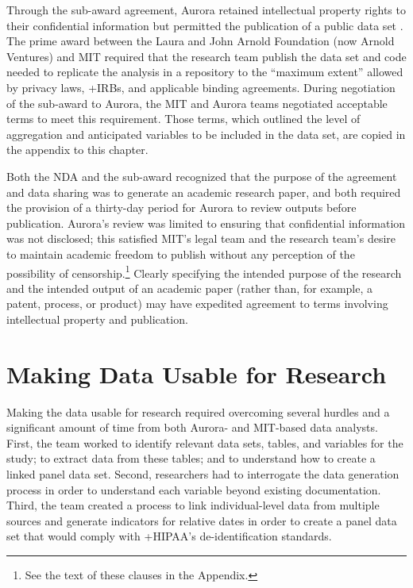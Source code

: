 \documentclass[
]{book}
\begin{document}
Through the sub-award agreement, Aurora retained intellectual property rights to their confidential information but permitted the publication of a public data set \citep[see][]{doyle2018}. The prime award between the Laura and John Arnold Foundation (now Arnold Ventures) and MIT required that the research team publish the data set and code needed to replicate the analysis in a repository to the ``maximum extent'' allowed by privacy laws, +IRB\textbar s, and applicable binding agreements. During negotiation of the sub-award to Aurora, the MIT and Aurora teams negotiated acceptable terms to meet this requirement. Those terms, which outlined the level of aggregation and anticipated variables to be included in the data set, are copied in the appendix to this chapter.

Both the NDA and the sub-award recognized that the purpose of the agreement and data sharing was to generate an academic research paper, and both required the provision of a thirty-day period for Aurora to review outputs before publication. Aurora's review was limited to ensuring that confidential information was not disclosed; this satisfied MIT's legal team and the research team's desire to maintain academic freedom to publish without any perception of the possibility of censorship.\footnote{See the text of these clauses in the Appendix.} Clearly specifying the intended purpose of the research and the intended output of an academic paper (rather than, for example, a patent, process, or product) may have expedited agreement to terms involving intellectual property and publication.

\hypertarget{making-data-usable-for-research-3}{%
\section{Making Data Usable for Research}\label{making-data-usable-for-research-3}}

Making the data usable for research required overcoming several hurdles and a significant amount of time from both Aurora- and MIT-based data analysts. First, the team worked to identify relevant data sets, tables, and variables for the study; to extract data from these tables; and to understand how to create a linked panel data set. Second, researchers had to interrogate the data generation process in order to understand each variable beyond existing documentation. Third, the team created a process to link individual-level data from multiple sources and generate indicators for relative dates in order to create a panel data set that would comply with +HIPAA\textbar's de-identification standards.
\end{document}
